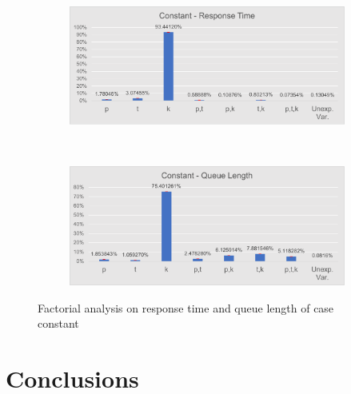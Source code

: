 \documentclass[a4paper,12pt]{article}
\begin{document}
\begin{figure}
  \centering
  \begin{subfigure}[b]{.45\textwidth}
    \includegraphics[width=\textwidth]{img/FactorAnalysisResponseTimeCONST.pdf}
  \end{subfigure}
  ~
  \begin{subfigure}[b]{.45\textwidth}
    \includegraphics[width=\textwidth]{img/FactorAnalysisQueueLengthCONST.pdf}
  \end{subfigure}
  \caption{Factorial analysis on response time and queue length of case constant }
  \label{fig:faconst}
\end{figure}

\section{Conclusions}
\end{document}

